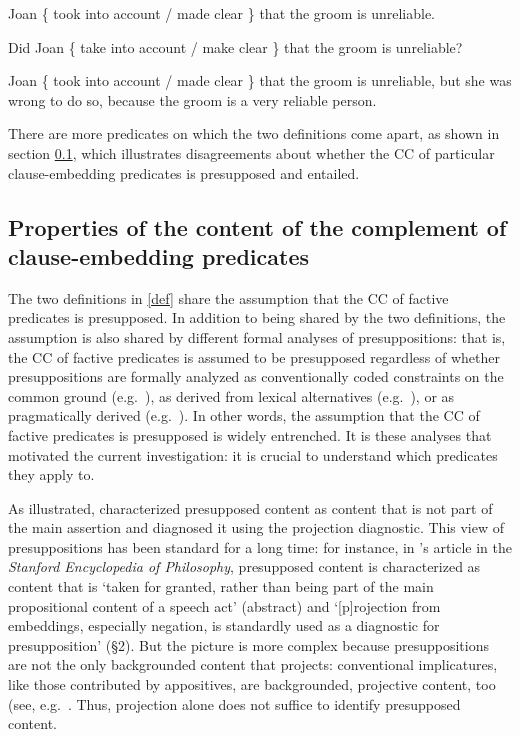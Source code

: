 \documentclass{language}
\newcommand{\6}{\mbox{$[\hspace*{-.6mm}[$}}
\newcommand{\9}{\mbox{$]\hspace*{-.6mm}]$}}
\newcommand{\citepos}[1]{\citeauthor{#1}'s \citeyear{#1}}
\begin{document}
\begin{exe}
\ex\label{kip2}
\begin{xlist}
\ex Joan  \{ took into account /  made clear \}  that the groom is unreliable.

\ex Did Joan \{ take into account / make clear \} that the groom is unreliable?
\end{xlist}
\ex\label{kip3} Joan  \{ took into account / made clear \} that the groom is unreliable, but she was wrong to do so, because the groom is a very reliable person.
\end{exe}
There are more predicates on which the two definitions come apart, as shown in section \ref{s12}, which illustrates disagreements about whether the CC of particular clause-embedding predicates is presupposed and entailed.

\subsection{Properties of the content of the complement of clause-embedding predicates}\label{s12}
	
 The two definitions in \ref{def} share the assumption that the CC of factive predicates is presupposed. In addition to being shared by the two definitions, the assumption is also shared by different formal analyses of presuppositions: that is, the CC of factive predicates is assumed to be presupposed regardless of whether presuppositions are formally analyzed as conventionally coded constraints on the common ground (e.g.\ \citealt{heim83,vds92}), as derived from lexical alternatives (e.g.\ \citealt{abusch10, romoli2015}), or as pragmatically derived (e.g.\ \citealt{abrusan2011,best-question}). In other words, the assumption that the CC of factive predicates is presupposed is widely entrenched. It is these analyses that motivated the current investigation: it is crucial to understand which predicates they apply to.

As illustrated, \citealt{kiparsky-kiparsky70} characterized presupposed content as content that is not part of the main assertion and diagnosed it using the projection diagnostic. This view of presuppositions has been standard for a long time: for instance, in \citepos{beaver-geurts-sep} article in the {\em Stanford Encyclopedia of Philosophy}, presupposed content is characterized as content that is `taken for granted, rather than being part of the main propositional content of a speech act' (abstract) and `[p]rojection from embeddings, especially negation, is standardly used as a diagnostic for presupposition' (\S2). But the picture is more complex because presuppositions are not the only backgrounded content that projects: conventional implicatures, like those contributed by appositives, are backgrounded, projective content, too (see, e.g.\ \citealt{ccmg90,potts05}. Thus, projection alone does not suffice to identify presupposed content.
\end{document}
